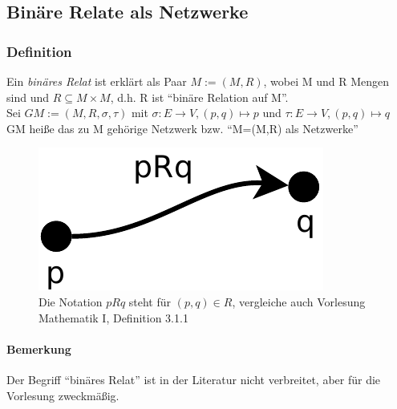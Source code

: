 \subsection{Binäre Relate als Netzwerke}
\subsubsection{Definition}
Ein \emph{binäres Relat} ist erklärt als Paar $M:=(M,R)$, wobei M und R Mengen sind und
$ {R} \subseteq {M \times M }$, d.h. R ist ``binäre Relation auf M''.
\\Sei $GM := (M,R,\sigma,\tau)$ mit $\sigma : E \rightarrow V, (p,q) \mapsto p$ und $\tau : E \rightarrow V, (p,q) \mapsto q$
\\GM heiße das zu M gehörige Netzwerk bzw.  ``M=(M,R) als Netzwerke''

\begin{figure}
 \centering
 \includegraphics[scale=0.7]{../bilder/binaere_relation.pdf}
 \caption{Die Notation $pRq$ steht für $(p,q) \in R$, vergleiche auch Vorlesung Mathematik I, Definition 3.1.1 }
\end{figure}


\paragraph{Bemerkung}
Der Begriff ``binäres Relat'' ist in der Literatur nicht verbreitet, aber für die Vorlesung zweckmäßig.
